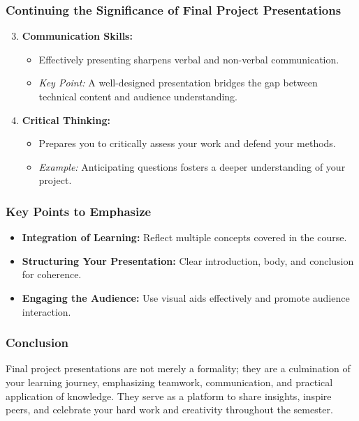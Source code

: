 \documentclass[aspectratio=169]{beamer}
\begin{document}
\begin{frame}[fragile]
    \frametitle{Continuing the Significance of Final Project Presentations}
    \begin{enumerate}
        \setcounter{enumi}{2} %
        \item \textbf{Communication Skills:}
            \begin{itemize}
                \item Effectively presenting sharpens verbal and non-verbal communication.
                \item \textit{Key Point:} A well-designed presentation bridges the gap between technical content and audience understanding.
            \end{itemize}

        \item \textbf{Critical Thinking:}
            \begin{itemize}
                \item Prepares you to critically assess your work and defend your methods.
                \item \textit{Example:} Anticipating questions fosters a deeper understanding of your project.
            \end{itemize}
    \end{enumerate}
\end{frame}

\begin{frame}[fragile]
    \frametitle{Key Points to Emphasize}
    \begin{itemize}
        \item \textbf{Integration of Learning:} Reflect multiple concepts covered in the course.
        \item \textbf{Structuring Your Presentation:} Clear introduction, body, and conclusion for coherence.
        \item \textbf{Engaging the Audience:} Use visual aids effectively and promote audience interaction.
    \end{itemize}
\end{frame}

\begin{frame}[fragile]
    \frametitle{Conclusion}
    Final project presentations are not merely a formality; they are a culmination of your learning journey, emphasizing teamwork, communication, and practical application of knowledge. They serve as a platform to share insights, inspire peers, and celebrate your hard work and creativity throughout the semester.
\end{frame}
\end{document}
